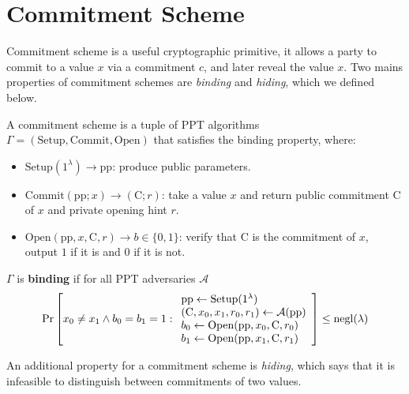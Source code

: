 \section{Commitment Scheme}

Commitment scheme is a useful cryptographic primitive, it allows a party to commit to a value $x$ via a commitment $c$, and later reveal the value $x$. Two mains properties of commitment schemes are \textit{binding} and \textit{hiding}, which we defined below.

\begin{definition}
\label{commitment-scheme}
A commitment scheme is a tuple of PPT algorithms $\Gamma = (\mathrm{Setup}, \mathrm{Commit}, \mathrm{Open})$ that satisfies the \textup{binding} property, where:
\begin{itemize}
    \item $\mathrm{Setup}(1^{\lambda}) \to \mathrm{pp}$: produce public parameters.
    \item $\mathrm{Commit}(\mathrm{pp}; x) \to (\mathrm{C}; r)$: take a value $x$ and return public commitment $\mathrm{C}$ of $x$ and private opening hint $r$.
    \item $\mathrm{Open}(\mathrm{pp}, x, \mathrm{C}, r) \to b \in \{0, 1\}$: verify that $\mathrm{C}$ is the commitment of $x$, output $1$ if it is and $0$ if it is not.
\end{itemize}

$\Gamma$ is \textbf{binding} if for all PPT adversaries $\mathcal{A}$
\begin{align*}
\mathrm{Pr} \left[ x_0 \ne x_1 \wedge b_0 = b_1 = 1 :
\begin{array}{l}
     \mathrm{pp} \gets \mathrm{Setup}(1^\lambda) \\
     (\mathrm{C}, x_0, x_1, r_0, r_1) \gets \mathcal{A}(\mathrm{pp}) \\
     b_0 \gets \mathrm{Open}(\mathrm{pp}, x_0, \mathrm{C}, r_0) \\
     b_1 \gets \mathrm{Open}(\mathrm{pp}, x_1, \mathrm{C}, r_1)
\end{array}
 \right] \le \mathrm{negl}(\lambda)
\end{align*}
\end{definition}

An additional property for a commitment scheme is \textit{hiding}, which says that it is infeasible to distinguish between commitments of two values.

